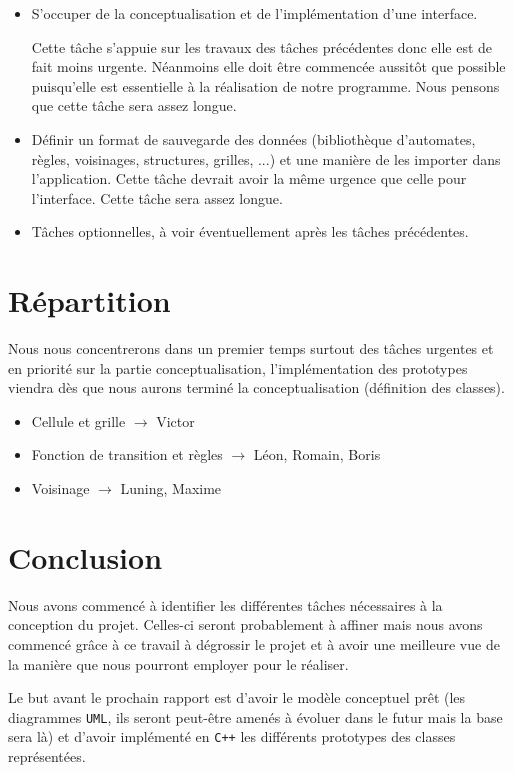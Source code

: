 \documentclass[11pt]{article}
\begin{document}
\begin{itemize}
    \item S'occuper de la conceptualisation et de l'implémentation d'une interface.
    
    Cette tâche s'appuie sur les travaux des tâches précédentes donc elle est de fait moins urgente. Néanmoins elle doit être commencée aussitôt que possible puisqu'elle est essentielle à la réalisation de notre programme. Nous pensons que cette tâche sera assez longue.
    
    \item Définir un format de sauvegarde des données (bibliothèque d'automates, règles, voisinages, structures, grilles, ...) et une manière de les importer dans l'application. Cette tâche devrait avoir la même urgence que celle pour l'interface. Cette tâche sera assez longue.
    
    \item Tâches optionnelles, à voir éventuellement après les tâches précédentes.
\end{itemize}

\section{Répartition}

Nous nous concentrerons dans un premier temps surtout des tâches urgentes et en priorité sur la partie conceptualisation, l'implémentation des prototypes viendra dès que nous aurons terminé la conceptualisation (définition des classes).

\bigskip

\begin{itemize}
    \item Cellule et grille $\rightarrow$ Victor
    \item Fonction de transition et règles $\rightarrow$ Léon, Romain, Boris
    \item Voisinage $\rightarrow$ Luning, Maxime
\end{itemize}

\section{Conclusion}

Nous avons commencé à identifier les différentes tâches nécessaires à la conception du projet. Celles-ci seront probablement à affiner mais nous avons commencé grâce à ce travail à dégrossir le projet et à avoir une meilleure vue de la manière que nous pourront employer pour le réaliser.

\medskip

Le but avant le prochain rapport est d'avoir le modèle conceptuel prêt (les diagrammes \texttt{UML}, ils seront peut-être amenés à évoluer dans le futur mais la base sera là) et d'avoir implémenté en \texttt{C++} les différents prototypes des classes représentées.
\end{document}
